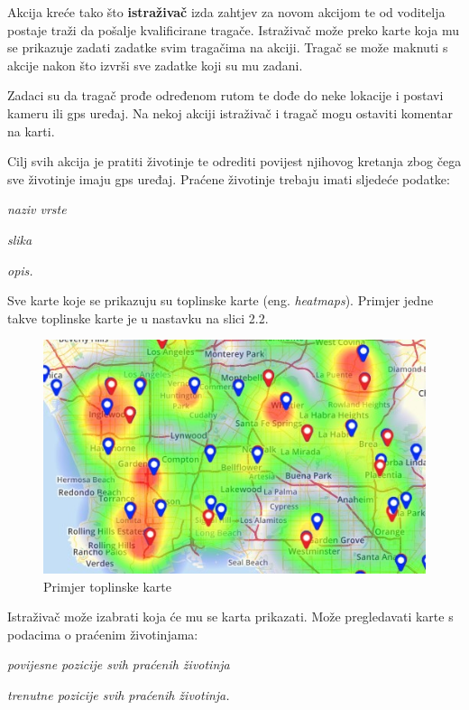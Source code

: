 		Akcija kreće tako što \textbf{istraživač} izda zahtjev za novom akcijom te od voditelja postaje traži da pošalje kvalificirane tragače. Istraživač može preko karte koja mu se prikazuje zadati zadatke svim tragačima na akciji. Tragač se može maknuti s akcije nakon što izvrši sve zadatke koji su mu zadani.
		
		Zadaci su da tragač prođe određenom rutom te dođe do neke lokacije i postavi kameru ili gps uređaj. Na nekoj akciji istraživač i tragač mogu ostaviti komentar na karti.
		
		Cilj svih akcija je pratiti životinje te odrediti povijest njihovog kretanja zbog čega sve životinje imaju gps uređaj. Praćene životinje trebaju imati sljedeće podatke:
		\begin{packed_item}
			\item \textit{naziv vrste}
			\item \textit{slika}
			\item \textit{opis.}
		\end{packed_item}
		
		Sve karte koje se prikazuju su toplinske karte (eng. \textit{heatmaps}). Primjer jedne takve toplinske karte je u nastavku na slici 2.2.
		
		\begin{figure}[H]
			\includegraphics[scale=0.8]{slike/heatmap.JPG} %
			\centering
			\caption{Primjer toplinske karte}
			\label{fig:prkarte} %
		\end{figure}
		
		Istraživač može izabrati koja će mu se karta prikazati. Može pregledavati karte s podacima o praćenim životinjama:
		\begin{packed_item}
			\item \textit{povijesne pozicije svih praćenih životinja }
			\item \textit{trenutne pozicije svih praćenih životinja.}
		\end{packed_item}
		
